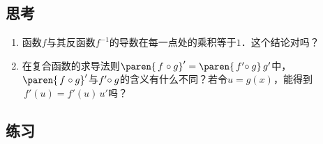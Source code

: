 \documentclass[a4paper,punct=CCT]{ctexbook}
\theoremstyle{definition}
\theoremstyle{remark}
\newif\ifshowex
\newif\ifshowsolp
\begin{document}
\subsection*{思考}

\begin{enumerate}
\item 函数\(f\)与其反函数\(f^{-1}\)的导数在每一点处的乘积等于\(1\)．这个结论对吗？

  \ifshowsolp
  不对．函数\(f(x) = x^3\!\)与其反函数\(f^{-1}(x) = \sqrt[\leftroot{-2}\uproot{2}3]x\)在点\(2\)处的导数分别是\(12\)和\(\sqrt[\leftroot{-2}\uproot{2}3]{2}\big/{6}\)，显然它们的乘积\(2\sqrt[\leftroot{-2}\uproot{2}3]2 > 1\)．
  \fi

\item 在复合函数的求导法则\(\paren{\,f\mkern1mu \circ g}' = \paren{\,f'\mkern-4mu \circ g}\,g'\)中，\(\paren{\,f\mkern1mu \circ g}'\)与\(f'\mkern-4mu \circ g\)的含义有什么不同？若令\(u = g(x)\)，能得到\(\,f'(u) = f'(u)\,u'\)吗？

  \ifshowsolp
  前者是先复合再求导，后者是先求导再复合．不能．
  \fi
\end{enumerate}

\ifshowex
{}
\subsection*{练习}
\end{document}
